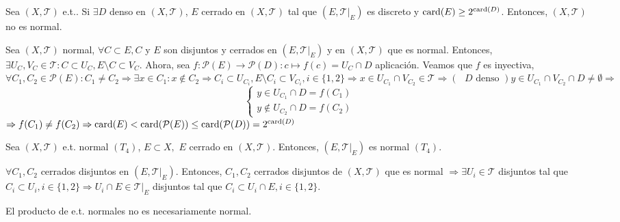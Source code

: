 \begin{lem}[Jones]
  Sea $( X, \mathcal{T} )$ e.t.. Si $\exists D$ denso en $ ( X, \mathcal{T} )$, $E$ cerrado en $( X, \mathcal{T} )$ tal que $( E, \mathcal{T}|_{E})$ es discreto y $\operatorname{card}(E) \geq 2^{\operatorname{card}(D)}$. Entonces, $( X, \mathcal{T} )$ no es normal.
\end{lem}

\begin{dem}
  Sea $( X, \mathcal{T} )$ normal, $\forall C \subset E, C$ y $E$ son disjuntos y cerrados en $( E, \mathcal{T}|_{E})$ y en $( X, \mathcal{T} )$ que es normal. Entonces, $\exists U_{C}, V_{C} \in \mathcal{T}: C \subset U_{C}, E \setminus C \subset V_{C} $. Ahora, sea $f: \mathcal{P}(E) \to \mathcal{P}(D): c \mapsto f(c) = U_{C} \cap D$ aplicación. Veamos que $f$ es inyectiva, $\forall C_{1}, C_{2} \in \mathcal{P}(E) : C_{1} \neq C_{2} \Rightarrow \exists x \in C_{1} : x \not \in C_{2} \Rightarrow C_{i} \subset U_{C_{i}}, E \setminus C_{i} \subset V_{C_{i}}, i \in \{ 1, 2 \} \Rightarrow x \in U_{C_{1}} \cap V_{C_{2}} \in \mathcal{T} \Rightarrow (\text{ $D$ denso }) y \in U_{C_{1}} \cap V_{C_{2}} \cap D \neq \emptyset \Rightarrow$
  \[ 
    \begin{cases}
      y \in U_{C_{1}} \cap D = f(C_{1}) \\ 
      y \not \in U_{C_{2}} \cap D = f(C_{2}) 
    \end{cases} 
  \] 
  $\Rightarrow f(C_{1}) \neq f(C_{2}) \Rightarrow  \operatorname{card}(E) < \operatorname{card}(\mathcal{P}(E)) \leq \operatorname{card}(\mathcal{P}(D)) = 2^{\operatorname{card}(D)} $
\end{dem}

\begin{prop}
  Sea $( X, \mathcal{T} )$ e.t. normal $( T_{4})$, $E \subset X,$ $E$ cerrado en $( X, \mathcal{T} )$. Entonces, $( E, \mathcal{T}|_{E})$ es normal $(T_{4})$.
\end{prop}

\begin{dem}
  $\forall C_{1}, C_{2}$ cerrados disjuntos en $( E, \mathcal{T}|_{E})$. Entonces, $C_{1}, C_{2}$ cerrados disjuntos de $ ( X, \mathcal{T} )$ que es normal $ \Rightarrow \exists U_{i} \in \mathcal{T}$ disjuntos tal que $C_{i} \subset U_{i},  i \in \{  1, 2 \} \Rightarrow U_{i} \cap E \in \mathcal{T}|_{E}$ disjuntos tal que $C_{i} \subset U_{i} \cap E, i \in \{ 1, 2 \}$.
\end{dem}

\begin{obs}
  El producto de e.t. normales no es necesariamente normal.
\end{obs}

